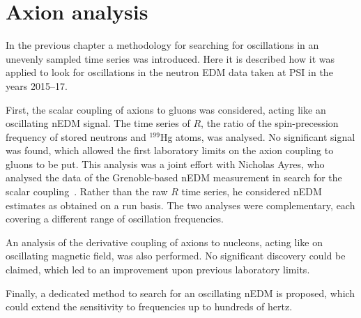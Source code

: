 \chapter{Axion analysis}
\label{ch:axion-analysis}
In the previous chapter a methodology for searching for oscillations in an unevenly sampled time series was introduced.
Here it is described how it was applied to look for oscillations in the neutron EDM data taken at PSI in the years 2015--17.

First, the scalar coupling of axions to gluons was considered, acting like an oscillating nEDM signal.
The time series of $R$, the ratio of the spin-precession frequency of stored neutrons and ${}^{199}$Hg atoms, was analysed.
No significant signal was found, which allowed the first laboratory limits on the axion coupling to gluons to be put.
This analysis was a joint effort with Nicholas Ayres, who analysed the data of the Grenoble-based nEDM measurement in search for the scalar coupling~\cite{AyresThesis}.
Rather than the raw $R$ time series, he considered nEDM estimates as obtained on a run basis.
The two analyses were complementary, each covering a different range of oscillation frequencies.

An analysis of the derivative coupling of axions to nucleons, acting like on oscillating magnetic field, was also performed.
No significant discovery could be claimed, which led to an improvement upon previous laboratory limits.

Finally, a dedicated method to search for an oscillating nEDM is proposed, which could extend the sensitivity to frequencies up to hundreds of hertz.





